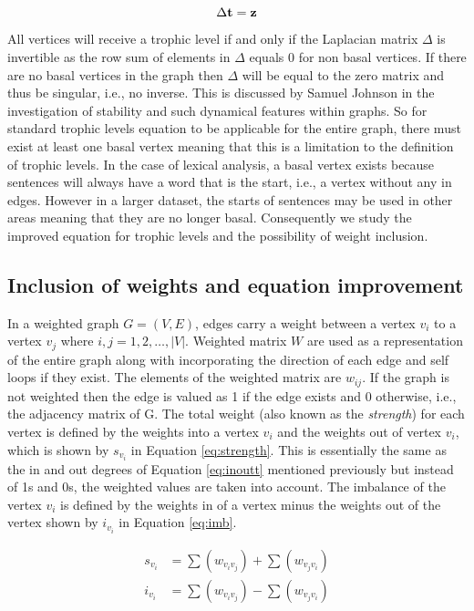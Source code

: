 \begin{equation} \label{eq:mtl}
\Delta\bold{t} = \bold{z} 
\end{equation}

All vertices will receive a trophic level if and only if the Laplacian matrix $\Delta$ is invertible as the row sum of elements in $\Delta$ equals 0 for non basal vertices. If there are no basal vertices in the graph then $\Delta$ will be equal to the zero matrix and thus be singular, i.e., no inverse. This is discussed by Samuel Johnson \cite{johnson2020digraphs} in the investigation of stability and such dynamical features within graphs. So for standard trophic levels equation to be applicable for the entire graph, there must exist at least one basal vertex meaning that this is a limitation to the definition of trophic levels. In the case of lexical analysis, a basal vertex exists because sentences will always have a word that is the start, i.e., a vertex without any in edges. However in a larger dataset, the starts of sentences may be used in other areas meaning that they are no longer basal. Consequently we study the improved equation for trophic levels and the possibility of weight inclusion. 

\subsection{Inclusion of weights and equation improvement}
In a weighted graph $G = (V, E)$, edges carry a weight between a vertex $v_i$ to a vertex $v_j$ where $i , j = 1 , 2, \dots , \lvert V \rvert$. Weighted matrix $W$ are used as a representation of the entire graph along with incorporating the direction of each edge and self loops if they exist. The elements of the weighted matrix are $w_{ij}$. If the graph is not weighted then the edge is valued as 1 if the edge exists and 0 otherwise, i.e., the adjacency matrix of G. The total weight (also known as the \emph{strength}) for each vertex is defined by the weights into a vertex $v_i$ and the weights out of vertex $v_i$, which is shown by $s_{v_i}$ in Equation \ref{eq:strength}. This is essentially the same as the in and out degrees of Equation \ref{eq:inoutt} mentioned previously but instead of 1s and 0s, the weighted values are taken into account. The imbalance of the vertex $v_i$ is defined by the weights in of a vertex minus the weights out of the vertex shown by $i_{v_i}$ in Equation \ref{eq:imb}.

\begin{align}
s_{v_i} &= \sum(w_{v_iv_j}) + \sum(w_{v_jv_i}) \label{eq:strength} \\
i_{v_i} &= \sum(w_{v_iv_j}) - \sum(w_{v_jv_i}) \label{eq:imb}
\end{align}

